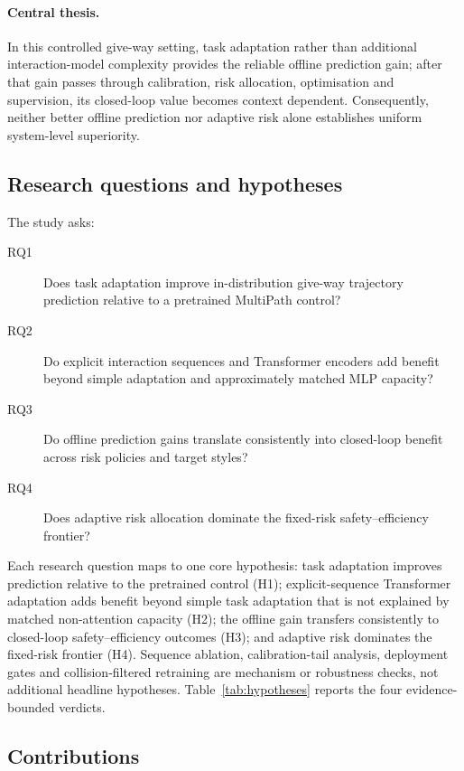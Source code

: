 \paragraph{Central thesis.}
In this controlled give-way setting, task adaptation rather than additional
interaction-model complexity provides the reliable offline prediction gain;
after that gain passes through calibration, risk allocation, optimisation and
supervision, its closed-loop value becomes context dependent. Consequently,
neither better offline prediction nor adaptive risk alone establishes uniform
system-level superiority.

\subsection{Research questions and hypotheses}

The study asks:

\begin{description}
  \item[RQ1] Does task adaptation improve in-distribution give-way trajectory
  prediction relative to a pretrained MultiPath control?
  \item[RQ2] Do explicit interaction sequences and Transformer encoders add
  benefit beyond simple adaptation and approximately matched MLP capacity?
  \item[RQ3] Do offline prediction gains translate consistently into
  closed-loop benefit across risk policies and target styles?
  \item[RQ4] Does adaptive risk allocation dominate the fixed-risk
  safety--efficiency frontier?
\end{description}

Each research question maps to one core hypothesis: task adaptation improves
prediction relative to the pretrained control (H1); explicit-sequence
Transformer adaptation adds benefit beyond simple task adaptation that is not
explained by matched non-attention capacity (H2);
the offline gain transfers consistently to closed-loop safety--efficiency
outcomes (H3); and adaptive risk dominates the fixed-risk frontier (H4).
Sequence ablation, calibration-tail analysis, deployment gates and
collision-filtered retraining are mechanism or robustness checks, not
additional headline hypotheses. Table~\ref{tab:hypotheses} reports the four
evidence-bounded verdicts.

\subsection{Contributions}

